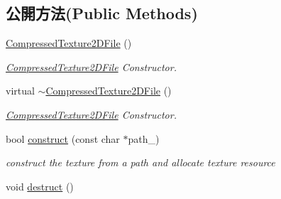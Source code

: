 \subsection*{公開方法(Public Methods)}
\begin{DoxyCompactItemize}
\item 
\hyperlink{class_i_dream_sky_1_1_compressed_texture2_d_file_a47e2ff19f5cdbb83d8fcc906edab722b}{Compressed\+Texture2\+D\+File} ()
\begin{DoxyCompactList}\small\item\em \hyperlink{class_i_dream_sky_1_1_compressed_texture2_d_file}{Compressed\+Texture2\+D\+File} Constructor. \end{DoxyCompactList}\item 
virtual \hyperlink{class_i_dream_sky_1_1_compressed_texture2_d_file_ac974ac9bbaf2f9edf2b5caf667c8c2e5}{$\sim$\+Compressed\+Texture2\+D\+File} ()
\begin{DoxyCompactList}\small\item\em \hyperlink{class_i_dream_sky_1_1_compressed_texture2_d_file}{Compressed\+Texture2\+D\+File} Constructor. \end{DoxyCompactList}\item 
bool \hyperlink{class_i_dream_sky_1_1_compressed_texture2_d_file_aa8d4b481c8417ebb76b9c7b7ab1214f6}{construct} (const char $\ast$path\+\_\+)
\begin{DoxyCompactList}\small\item\em construct the texture from a path and allocate texture resource \end{DoxyCompactList}\item 
void \hyperlink{class_i_dream_sky_1_1_compressed_texture2_d_file_a382a01f0190da9da25cb5177a8e1ad75}{destruct} ()\hypertarget{class_i_dream_sky_1_1_compressed_texture2_d_file_a382a01f0190da9da25cb5177a8e1ad75}{}\label{class_i_dream_sky_1_1_compressed_texture2_d_file_a382a01f0190da9da25cb5177a8e1ad75}


\end{DoxyCompactItemize}

